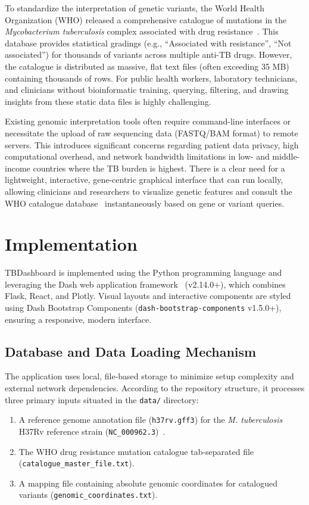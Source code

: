 \documentclass{article}
\begin{document}
To standardize the interpretation of genetic variants, the World Health Organization (WHO) released a comprehensive catalogue of mutations in the \textit{Mycobacterium tuberculosis} complex associated with drug resistance~\cite{whocatalogue}. This database provides statistical gradings (e.g., ``Associated with resistance'', ``Not associated'') for thousands of variants across multiple anti-TB drugs. However, the catalogue is distributed as massive, flat text files (often exceeding 35 MB) containing thousands of rows. For public health workers, laboratory technicians, and clinicians without bioinformatic training, querying, filtering, and drawing insights from these static data files is highly challenging.

Existing genomic interpretation tools often require command-line interfaces or necessitate the upload of raw sequencing data (FASTQ/BAM format) to remote servers. This introduces significant concerns regarding patient data privacy, high computational overhead, and network bandwidth limitations in low- and middle-income countries where the TB burden is highest. There is a clear need for a lightweight, interactive, gene-centric graphical interface that can run locally, allowing clinicians and researchers to visualize genetic features and consult the WHO catalogue database~\cite{whocatalogue} instantaneously based on gene or variant queries.

\section{Implementation}
TBDashboard is implemented using the Python programming language and leveraging the Dash web application framework~\cite{plotlydash} (v2.14.0+), which combines Flask, React, and Plotly. Visual layouts and interactive components are styled using Dash Bootstrap Components (\texttt{dash-bootstrap-components} v1.5.0+), ensuring a responsive, modern interface.

\subsection{Database and Data Loading Mechanism}
The application uses local, file-based storage to minimize setup complexity and external network dependencies. According to the repository structure, it processes three primary inputs situated in the \texttt{data/} directory:
\begin{enumerate}
    \item A reference genome annotation file (\texttt{h37rv.gff3}) for the \textit{M. tuberculosis} H37Rv reference strain (\texttt{NC\_000962.3})~\cite{refseq}.
    \item The WHO drug resistance mutation catalogue tab-separated file (\texttt{catalogue\_master\_file.txt}).
    \item A mapping file containing absolute genomic coordinates for catalogued variants (\texttt{genomic\_coordinates.txt}).
\end{enumerate}
\end{document}
